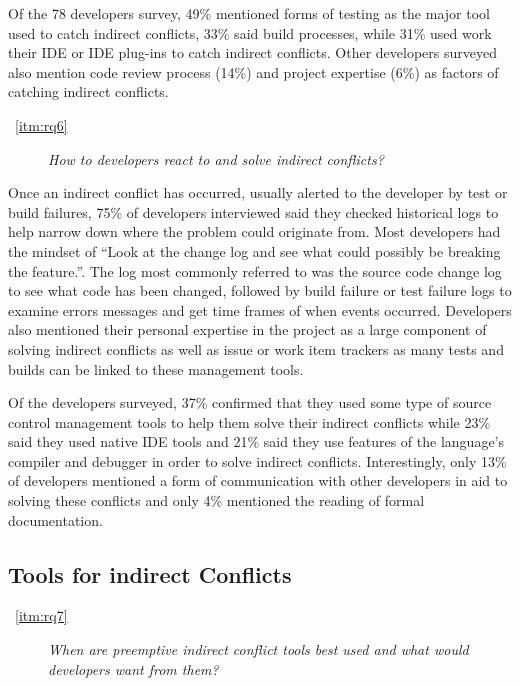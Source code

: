 \documentclass[conference]{IEEEtran}
\begin{document}
Of the 78 developers survey, 49\% mentioned forms of testing as the major tool used to catch indirect conflicts, 33\% said build processes,
while 31\% used work their IDE or IDE plug-ins to catch indirect conflicts. Other developers surveyed also mention code review process (14\%)
and project expertise (6\%) as factors of catching indirect conflicts.

\begin{description}
	\item[~\ref{itm:rq6}] \textit{How to developers react to and solve indirect conflicts?}
\end{description}

Once an indirect conflict has occurred, usually alerted to the developer by test or build failures, 75\% of developers interviewed said
they checked historical logs to help narrow down where the problem could originate from. Most developers had the mindset of
``Look at the change log and see what could possibly be breaking the feature.''. The log most commonly referred to was the source
code change log to see what code has been changed, followed by build failure or test failure logs to examine errors messages and get time 
frames of when events occurred. Developers also mentioned their personal expertise in the project as a large component of solving indirect
conflicts as well as issue or work item trackers as many tests and builds can be linked to these management tools.

Of the developers surveyed, 37\% confirmed that they used some type of source control management tools to help them solve their indirect
conflicts while 23\% said they used native IDE tools and 21\% said they use features of the language's compiler and debugger in order
to solve indirect conflicts. Interestingly, only 13\% of developers mentioned a form of communication with other developers in aid to
solving these conflicts and only 4\% mentioned the reading of formal documentation.

\subsection{Tools for indirect Conflicts}

\begin{description}
	\item[~\ref{itm:rq7}] \textit{When are preemptive indirect conflict tools best used and what would developers want from them?}
\end{description}
\end{document}
